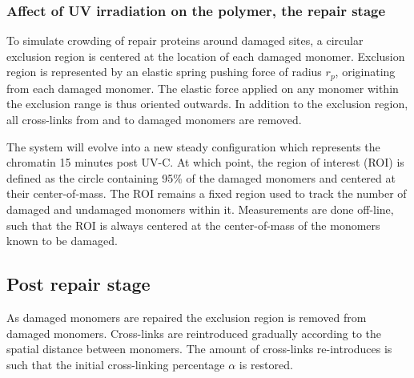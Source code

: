 \documentclass[12pt]{report}
\begin{document}
	\subsubsection{Affect of UV irradiation on the polymer, the repair stage}	
	To simulate crowding of repair proteins around damaged sites, a circular exclusion region is centered at the location of each damaged monomer. Exclusion region is represented by an elastic spring pushing force of radius $r_p$, originating from each damaged monomer. The elastic force applied on any monomer within the exclusion range is thus oriented outwards. In addition to the exclusion region, all cross-links from and to damaged monomers are removed.
	
	The system will evolve into a new steady configuration which represents the chromatin 15 minutes post UV-C. At which point, the region of interest (ROI) is defined as the circle containing 95\% of the damaged monomers and centered at their center-of-mass. The ROI remains a fixed region used to track the number of damaged and undamaged monomers within it. Measurements are done off-line, such that the ROI is always centered at the center-of-mass of the monomers known to be damaged.
	
	\subsection{Post repair stage}
	As damaged monomers are repaired the exclusion region is removed from damaged monomers. Cross-links are reintroduced gradually according to the spatial distance between monomers. The amount of cross-links re-introduces is such that the initial cross-linking percentage $\alpha$ is restored.
	
	
\end{document}
